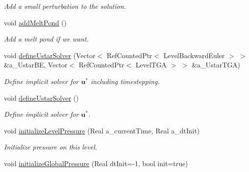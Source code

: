 \begin{DoxyCompactItemize}
\begin{DoxyCompactList}\small\item\em Add a small perturbation to the solution. \end{DoxyCompactList}\item 
\hypertarget{class_a_m_r_level_mushy_layer_a7b7760d193911a689cb815b254fd5e5e}{void \hyperlink{class_a_m_r_level_mushy_layer_a7b7760d193911a689cb815b254fd5e5e}{add\-Melt\-Pond} ()}\label{class_a_m_r_level_mushy_layer_a7b7760d193911a689cb815b254fd5e5e}

\begin{DoxyCompactList}\small\item\em Add a melt pond if we want. \end{DoxyCompactList}\item 
\hypertarget{class_a_m_r_level_mushy_layer_a042642fed8f9a314bc7b42a8c2766f0d}{void \hyperlink{class_a_m_r_level_mushy_layer_a042642fed8f9a314bc7b42a8c2766f0d}{define\-Ustar\-Solver} (Vector$<$ Ref\-Counted\-Ptr$<$ Level\-Backward\-Euler $>$ $>$ \&a\-\_\-\-Ustar\-B\-E, Vector$<$ Ref\-Counted\-Ptr$<$ Level\-T\-G\-A $>$ $>$ \&a\-\_\-\-Ustar\-T\-G\-A)}\label{class_a_m_r_level_mushy_layer_a042642fed8f9a314bc7b42a8c2766f0d}

\begin{DoxyCompactList}\small\item\em Define implicit solver for $ \mathbf{u}^* $ including timestepping. \end{DoxyCompactList}\item 
\hypertarget{class_a_m_r_level_mushy_layer_a21d85bbce02a400b103637203a57a3b3}{void \hyperlink{class_a_m_r_level_mushy_layer_a21d85bbce02a400b103637203a57a3b3}{define\-Ustar\-Solver} ()}\label{class_a_m_r_level_mushy_layer_a21d85bbce02a400b103637203a57a3b3}

\begin{DoxyCompactList}\small\item\em Define implicit solver for $ \mathbf{u}^* $. \end{DoxyCompactList}\item 
\hypertarget{class_a_m_r_level_mushy_layer_a0f1af6cfb8e2c45d129ad1915ede5dde}{void \hyperlink{class_a_m_r_level_mushy_layer_a0f1af6cfb8e2c45d129ad1915ede5dde}{initialize\-Level\-Pressure} (Real a\-\_\-current\-Time, Real a\-\_\-dt\-Init)}\label{class_a_m_r_level_mushy_layer_a0f1af6cfb8e2c45d129ad1915ede5dde}

\begin{DoxyCompactList}\small\item\em Initialize pressure on this level. \end{DoxyCompactList}\item 
\hypertarget{class_a_m_r_level_mushy_layer_a1f0fe62753524750fe9b697cfef36f7f}{void \hyperlink{class_a_m_r_level_mushy_layer_a1f0fe62753524750fe9b697cfef36f7f}{initialize\-Global\-Pressure} (Real dt\-Init=-\/1, bool init=true)}\label{class_a_m_r_level_mushy_layer_a1f0fe62753524750fe9b697cfef36f7f}


\end{DoxyCompactItemize}
